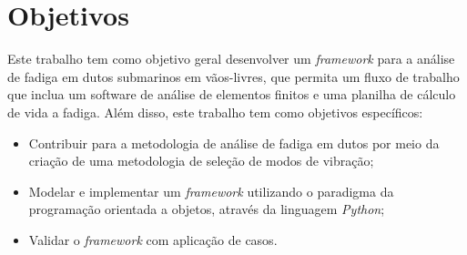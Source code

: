 % 


\section{Objetivos}

Este trabalho tem como objetivo geral desenvolver um \textit{framework} para a análise de fadiga em dutos submarinos em vãos-livres, que permita um fluxo de trabalho que inclua um software de análise de elementos finitos e uma planilha de cálculo de vida a fadiga.
Além disso, este trabalho tem como objetivos específicos:

\begin{itemize}
    \item Contribuir para a metodologia de análise de fadiga em dutos por meio da criação de uma metodologia de seleção de modos de vibração;
    \item Modelar e implementar um \textit{framework} utilizando o paradigma da programação orientada a objetos, através da linguagem \textit{Python};
    \item Validar o \textit{framework} com aplicação de casos.
\end{itemize}

% 
